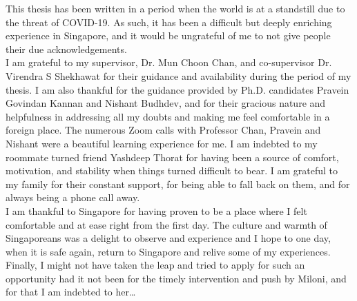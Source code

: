 \documentclass[11pt, a4paper, oneside]{Thesis} %
\begin{document}
\begin{acknowledgements}
    This thesis has been written in a period when the world is at a standstill due to the threat of 
    COVID-19. As such, it has been a difficult but deeply enriching experience in Singapore, and it would
    be ungrateful of me to not give people their due acknowledgements.
    \\
    I am grateful to my supervisor, Dr. Mun Choon Chan, and co-supervisor Dr. Virendra S Shekhawat
    for their guidance and availability during the period of my thesis. I am also thankful for the
    guidance provided by Ph.D. candidates Pravein Govindan Kannan and Nishant Budhdev, and for their gracious nature and helpfulness in addressing all my doubts and making me feel comfortable in a foreign place. The
    numerous Zoom calls with Professor Chan, Pravein and Nishant were a beautiful learning
    experience for me. I am indebted to my roommate turned friend Yashdeep Thorat for having been a source of comfort,
    motivation, and stability when things turned difficult to bear. I am grateful to my family for their constant support, for being able to fall back on them, and for always being a phone call away.
    \\
    I am thankful to Singapore for having proven to be a place where I felt comfortable and at ease right from the first day. The culture and warmth of Singaporeans was a delight to observe and experience
    and I hope to one day, when it is safe again, return to Singapore and relive some of my experiences.
    \\
    Finally, I might not have taken the leap and tried to 
    apply for such an opportunity had it not been for the timely intervention and push by Miloni, and for that I am indebted to her\ldots
\end{acknowledgements}


\pagestyle{fancy}

\tableofcontents %

\listoffigures %
\end{document}
